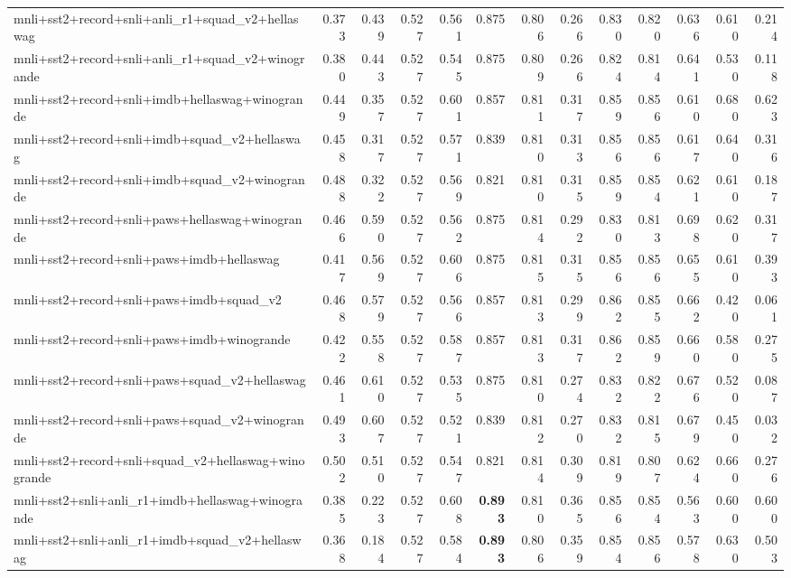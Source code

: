 \begin{table}[t]
\begin{tabular}{lrrrrrrrrrrrr}
    mnli+sst2+record+snli+anli\_r1+squad\_v2+hellaswag & 0.373 & 0.439 & 0.527 & 0.561 & 0.875 & 0.806 & 0.266 & 0.830 & 0.820 & 0.636 & 0.610 & 0.214 \\
    mnli+sst2+record+snli+anli\_r1+squad\_v2+winogrande & 0.380 & 0.443 & 0.527 & 0.545 & 0.875 & 0.809 & 0.266 & 0.824 & 0.814 & 0.641 & 0.530 & 0.118 \\
    mnli+sst2+record+snli+imdb+hellaswag+winogrande & 0.449 & 0.357 & 0.527 & 0.601 & 0.857 & 0.811 & 0.317 & 0.859 & 0.856 & 0.610 & 0.680 & 0.623 \\
    mnli+sst2+record+snli+imdb+squad\_v2+hellaswag & 0.458 & 0.317 & 0.527 & 0.571 & 0.839 & 0.810 & 0.313 & 0.856 & 0.856 & 0.617 & 0.640 & 0.316 \\
    mnli+sst2+record+snli+imdb+squad\_v2+winogrande & 0.488 & 0.322 & 0.527 & 0.569 & 0.821 & 0.810 & 0.315 & 0.859 & 0.854 & 0.621 & 0.610 & 0.187 \\
    mnli+sst2+record+snli+paws+hellaswag+winogrande & 0.466 & 0.590 & 0.527 & 0.562 & 0.875 & 0.814 & 0.292 & 0.830 & 0.813 & 0.698 & 0.620 & 0.317 \\
    mnli+sst2+record+snli+paws+imdb+hellaswag & 0.417 & 0.569 & 0.527 & 0.606 & 0.875 & 0.815 & 0.315 & 0.856 & 0.856 & 0.655 & 0.610 & 0.393 \\
    mnli+sst2+record+snli+paws+imdb+squad\_v2 & 0.468 & 0.579 & 0.527 & 0.566 & 0.857 & 0.813 & 0.299 & 0.862 & 0.855 & 0.662 & 0.420 & 0.061 \\
    mnli+sst2+record+snli+paws+imdb+winogrande & 0.422 & 0.558 & 0.527 & 0.587 & 0.857 & 0.813 & 0.317 & 0.862 & 0.859 & 0.660 & 0.580 & 0.275 \\
    mnli+sst2+record+snli+paws+squad\_v2+hellaswag & 0.461 & 0.610 & 0.527 & 0.535 & 0.875 & 0.810 & 0.274 & 0.832 & 0.822 & 0.676 & 0.520 & 0.087 \\
    mnli+sst2+record+snli+paws+squad\_v2+winogrande & 0.493 & 0.607 & 0.527 & 0.521 & 0.839 & 0.812 & 0.270 & 0.832 & 0.815 & 0.679 & 0.450 & 0.032 \\
    mnli+sst2+record+snli+squad\_v2+hellaswag+winogrande & 0.502 & 0.510 & 0.527 & 0.547 & 0.821 & 0.814 & 0.309 & 0.819 & 0.807 & 0.624 & 0.660 & 0.276 \\
    mnli+sst2+snli+anli\_r1+imdb+hellaswag+winogrande & 0.385 & 0.223 & 0.527 & 0.608 & \textbf{0.893} & 0.810 & 0.365 & 0.856 & 0.854 & 0.563 & 0.600 & 0.600 \\
    mnli+sst2+snli+anli\_r1+imdb+squad\_v2+hellaswag & 0.368 & 0.184 & 0.527 & 0.584 & \textbf{0.893} & 0.806 & 0.359 & 0.854 & 0.856 & 0.578 & 0.630 & 0.503 \\

\end{tabular}
\end{table}
